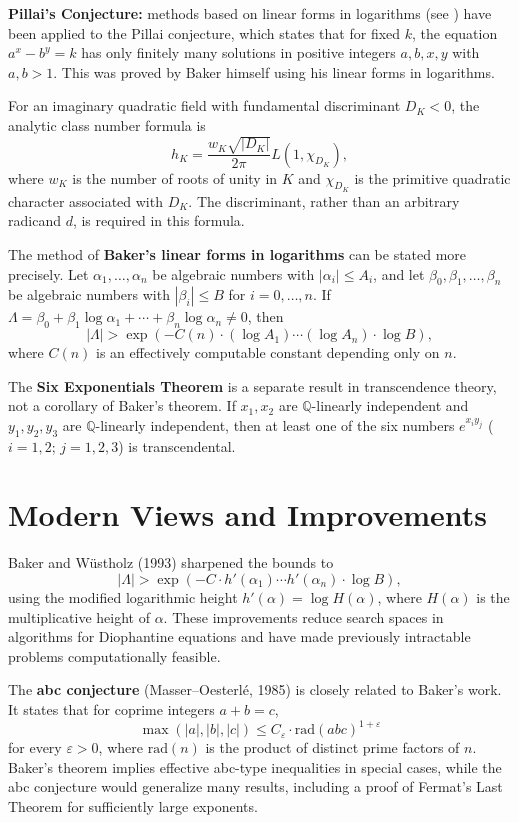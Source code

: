 \textbf{Pillai's Conjecture:} methods based on linear forms in logarithms (see \cite{baker1966}) have been applied to the Pillai conjecture, which states that for fixed $k$, the equation $a^x - b^y = k$ has only finitely many solutions in positive integers $a, b, x, y$ with $a, b > 1$. This was proved by Baker himself using his linear forms in logarithms.

For an imaginary quadratic field with fundamental discriminant $D_K<0$, the analytic class number formula is
\[
h_K = \frac{w_K\sqrt{|D_K|}}{2\pi} L(1, \chi_{D_K}),
\]
where $w_K$ is the number of roots of unity in $K$ and $\chi_{D_K}$ is the primitive quadratic character associated with $D_K$. The discriminant, rather than an arbitrary radicand $d$, is required in this formula.

The method of \textbf{Baker's linear forms in logarithms} can be stated more precisely. Let $\alpha_1, \ldots, \alpha_n$ be algebraic numbers with $|\alpha_i| \leq A_i$, and let $\beta_0, \beta_1, \ldots, \beta_n$ be algebraic numbers with $|\beta_i| \leq B$ for $i = 0, \ldots, n$. If $\Lambda = \beta_0 + \beta_1 \log \alpha_1 + \cdots + \beta_n \log \alpha_n \neq 0$, then
\[
|\Lambda| > \exp\left(-C(n) \cdot (\log A_1) \cdots (\log A_n) \cdot \log B\right),
\]
where $C(n)$ is an effectively computable constant depending only on $n$.

The \textbf{Six Exponentials Theorem} is a separate result in transcendence theory, not a corollary of Baker's theorem. If $x_1, x_2$ are $\mathbb{Q}$-linearly independent and $y_1, y_2, y_3$ are $\mathbb{Q}$-linearly independent, then at least one of the six numbers $e^{x_i y_j}$ ($i=1,2$; $j=1,2,3$) is transcendental.

\section{Modern Views and Improvements}

Baker and W\"{u}stholz (1993) sharpened the bounds to
\[
|\Lambda| > \exp(-C \cdot h'(\alpha_1) \cdots h'(\alpha_n) \cdot \log B),
\]
using the modified logarithmic height $h'(\alpha) = \log H(\alpha)$, where $H(\alpha)$ is the multiplicative height of $\alpha$. These improvements reduce search spaces in algorithms for Diophantine equations and have made previously intractable problems computationally feasible.

The \textbf{abc conjecture} (Masser--Oesterl\'e, 1985) is closely related to Baker's work. It states that for coprime integers $a + b = c$,
\[
\max(|a|, |b|, |c|) \leq C_\varepsilon \cdot \text{rad}(abc)^{1+\varepsilon}
\]
for every $\varepsilon > 0$, where $\text{rad}(n)$ is the product of distinct prime factors of $n$. Baker's theorem implies effective abc-type inequalities in special cases, while the abc conjecture would generalize many results, including a proof of Fermat's Last Theorem for sufficiently large exponents.

